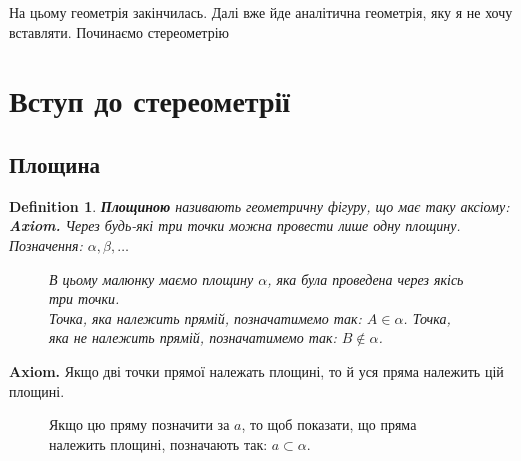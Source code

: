 \documentclass[a4paper, 10pt]{article}
\theoremstyle{theoremdd}
\theoremstyle{theoremdd}
\theoremstyle{theoremdd}
\newtheorem{definition}[theorem]{Definition}
\theoremstyle{theoremdd}
\theoremstyle{theoremdd}
\theoremstyle{theoremdd}
\theoremstyle{theoremdd}
\theoremstyle{theoremdd}
\theoremstyle{theoremdd}
\begin{document}
\newpage
На цьому геометрія закінчилась. Далі вже йде аналітична геометрія, яку я не хочу вставляти. Починаємо стереометрію
\newpage

\section{Вступ до стереометрії}
\subsection{Площина}
\begin{definition}
\textbf{Площиною} називають геометричну фігуру, що має таку аксіому:\\
\textbf{Axiom.} Через будь-які три точки можна провести лише одну площину.\\
Позначення: $\alpha,\beta,\dots$
\begin{figure}[H]
\centering
{}
\caption*{В цьому малюнку маємо площину $\alpha$, яка була проведена через якісь три точки. \\
Точка, яка належить прямій, позначатимемо так: $A \in \alpha$. Точка, яка не належить прямій, позначатимемо так: $B \not\in \alpha$.}
\end{figure}
\end{definition}

\textbf{Axiom.} Якщо дві точки прямої належать площині, то й уся пряма належить цій площині.

\begin{figure}[H]
\centering
{}
\caption*{Якщо цю пряму позначити за $a$, то щоб показати, що пряма належить площині, позначають так: $a \subset \alpha$.}
\end{figure}
\end{document}
